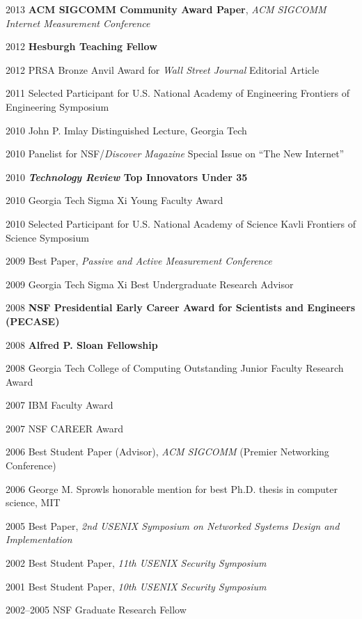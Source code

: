 \begin{cvlist}{}
\item[2013] {\bf ACM SIGCOMM Community Award Paper}, {\em ACM SIGCOMM Internet
  Measurement Conference}
\item[2012] {\bf Hesburgh Teaching Fellow}
\item[2012] PRSA Bronze Anvil Award for {\em Wall Street Journal}
  Editorial Article
\item[2011] Selected Participant for U.S. National Academy of
  Engineering Frontiers of Engineering Symposium
\item[2010] John P. Imlay Distinguished Lecture, Georgia Tech
\item[2010] Panelist for NSF/{\em Discover Magazine}
  Special Issue on ``The New Internet''
\item[2010] {\bf {\em Technology Review} Top Innovators Under 35}
\item[2010] Georgia Tech Sigma Xi Young Faculty Award
\item[2010] Selected Participant for U.S. National Academy of Science Kavli Frontiers of Science Symposium
\item[2009] Best Paper, {\em Passive and Active Measurement Conference}\nw
\item[2009] Georgia Tech Sigma Xi Best Undergraduate Research Advisor\nw
\item[2008] {\bf NSF Presidential Early Career Award for Scientists and
  Engineers (PECASE)}\nw
\item[2008] {\bf Alfred P. Sloan Fellowship}
\item[2008] Georgia Tech College of Computing Outstanding Junior Faculty
  Research Award
\item[2007] IBM Faculty Award
\item[2007] NSF CAREER Award
\item[2006] Best Student Paper (Advisor), {\em ACM SIGCOMM} (Premier
  Networking Conference) 
\item[2006] George M. Sprowls honorable mention for best Ph.D. thesis in
  computer science, MIT
\item[2005] Best Paper, {\em 2nd USENIX Symposium on Networked Systems Design
  and Implementation}
\item[2002] Best Student Paper, {\em 11th USENIX Security Symposium}
\item[2001] Best Student Paper, {\em 10th USENIX Security Symposium}
\item[2002--2005] NSF Graduate Research Fellow

\end{cvlist}
